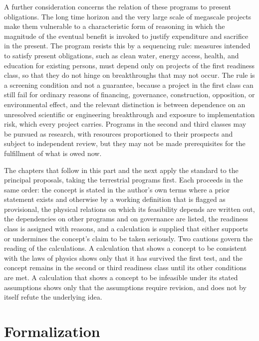A further consideration concerns the relation of these programs to present obligations. The long time horizon and the very large scale of megascale projects make them vulnerable to a characteristic form of reasoning in which the magnitude of the eventual benefit is invoked to justify expenditure and sacrifice in the present. The program resists this by a sequencing rule: measures intended to satisfy present obligations, such as clean water, energy access, health, and education for existing persons, must depend only on projects of the first readiness class, so that they do not hinge on breakthroughs that may not occur. The rule is a screening condition and not a guarantee, because a project in the first class can still fail for ordinary reasons of financing, governance, construction, opposition, or environmental effect, and the relevant distinction is between dependence on an unresolved scientific or engineering breakthrough and exposure to implementation risk, which every project carries. Programs in the second and third classes may be pursued as research, with resources proportioned to their prospects and subject to independent review, but they may not be made prerequisites for the fulfillment of what is owed now.

The chapters that follow in this part and the next apply the standard to the principal proposals, taking the terrestrial programs first. Each proceeds in the same order: the concept is stated in the author's own terms where a prior statement exists and otherwise by a working definition that is flagged as provisional, the physical relations on which its feasibility depends are written out, the dependencies on other programs and on governance are listed, the readiness class is assigned with reasons, and a calculation is supplied that either supports or undermines the concept's claim to be taken seriously. Two cautions govern the reading of the calculations. A calculation that shows a concept to be consistent with the laws of physics shows only that it has survived the first test, and the concept remains in the second or third readiness class until its other conditions are met. A calculation that shows a concept to be infeasible under its stated assumptions shows only that the assumptions require revision, and does not by itself refute the underlying idea.

\section*{Formalization}

